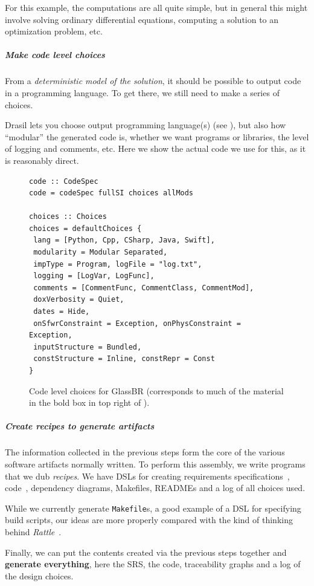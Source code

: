 \documentclass[a4paper,UKenglish,cleveref,autoref,thm-restate]{oasics-v2021}
\begin{document}
For this example, the computations are all quite simple, but in general this
might involve solving ordinary differential equations, computing a solution to
an optimization problem, etc.

\subparagraph*{Make code level choices}
From a \emph{deterministic model of the solution}, it should be
possible to output code in a programming language. To get there, we still need
to make a series of choices.

Drasil lets you choose output programming language(s) (see
), but also how ``modular'' the generated code is, whether
we want programs or libraries, the level of logging and comments, etc. Here we
show the actual code we use for this, as it is reasonably direct.

\begin{figure}[htb]
\begin{lstlisting}
code :: CodeSpec
code = codeSpec fullSI choices allMods

choices :: Choices
choices = defaultChoices {
 lang = [Python, Cpp, CSharp, Java, Swift], 
 modularity = Modular Separated,
 impType = Program, logFile = "log.txt", 
 logging = [LogVar, LogFunc],
 comments = [CommentFunc, CommentClass, CommentMod], 
 doxVerbosity = Quiet,
 dates = Hide, 
 onSfwrConstraint = Exception, onPhysConstraint = Exception,
 inputStructure = Bundled, 
 constStructure = Inline, constRepr = Const
}
\end{lstlisting}
  \caption{Code level choices for GlassBR (corresponds to much of the material
  in the bold box in top right of ).}
  \label{fig:CodeChoices}
\end{figure}

\subparagraph*{Create recipes to generate artifacts}
The information collected in the previous steps form the core of the various
software artifacts normally written. To perform this assembly, we write
programs that we dub \emph{recipes}. We have DSLs for creating 
requirements specifications~\cite{SmithEtAl2007},
code~\cite{GOOLPEPM}, dependency diagrams, Makefiles, READMEs and a log of all choices
used.

While we currently generate \texttt{Makefile}s, a good example of a DSL for
specifying build scripts, our ideas are more properly compared with
the kind of thinking behind \textit{Rattle}~\cite{mitchell:rattle_18_nov_2020}.

Finally, we can put the contents created via the previous steps together and
\textbf{generate everything}, here the SRS, the code, traceability graphs and
a log of the design choices.
\end{document}
